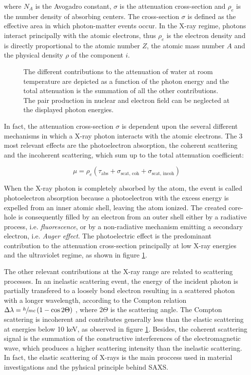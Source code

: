 where $N_A$ is the Avogadro constant, $\sigma$ is the attenuation cross-section and $\rho_e$ is the number density of absorbing centers. The cross-section $\sigma$ is defined as the effective area in which photon-matter events occur. In the X-ray regime, photons interact principally with the atomic electrons, thus $\rho_e$ is the electron density and is directly proportional to the atomic number $Z$, the atomic mass number $A$ and the physical density $\rho$ of the component $i$. 

\begin{figure}%
	\centering
		
		\caption{The different contributions to the attenuation of water at room temperature are depicted as a function of the photon energy\citep{henke_x-ray_1993} and the total attenuation is the summation of all the other contributions. The pair production in nuclear and electron field can be neglected at the displayed photon energies.}
		\label{fig:AttenuationWater}
\end{figure}

In fact, the attenuation cross-section $\sigma$ is dependent upon the several different mechanisms in which a X-ray photon interacts with the atomic electrons. The 3 most relevant effects are the photoelectron absorption, the coherent scattering and the incoherent scattering, which sum up to the total attenuation coefficient:

\begin{equation}
        \mu = \rho_e (\tau_{\text{abs}}+\sigma_{\text{scat, coh}}+\sigma_{\text{scat, incoh}})
\end{equation}

When the X-ray photon is completely absorbed by the atom, the event is called photoelectron absorption because a photoelectron with the excess energy is expelled from an inner atomic shell, leaving the atom ionized. The created core-hole is consequently filled by an electron from an outer shell either by a radiative process, i.e. \emph{fluorescence}, or by a non-radiative mechanism emitting a secondary electron, i.e. \emph{Auger effect}. The photoelectric effect is the predominant contribution to the attenuation cross-section principally at low X-ray energies and the ultraviolet regime, as shown in figure \ref{fig:AttenuationWater}. 

The other relevant contributions at the X-ray range are related to scattering processes. In an inelastic scattering event, the energy of the incident photon is partially transfered to a loosely bond electron resulting in a scattered photon with a longer wavelength, according to the Compton relation $\Delta\lambda = \sfrac{h}{m c}\left( 1 - \cos{2\Theta} \right) $ \citep{als-nielsen_elements_2011}, where $2\Theta$ is the scattering angle. The Compton scattering is incoherent and contributes generally less than the elastic scattering at energies below 10 keV, as observed in figure \ref{fig:AttenuationWater}. Besides, the coherent scattering signal is the summation of the constructive interferences of the electromagnetic wave, which produces a higher scattering intensity than the inelastic scattering. In fact, the elastic scattering of X-rays is the main proccess used in material investigations and the pyhsical principle behind SAXS.


